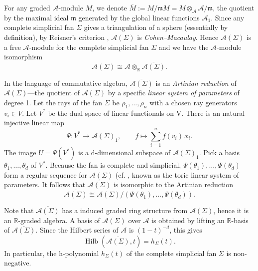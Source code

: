 \documentclass{amsart}
\theoremstyle{definition}
\theoremstyle{remark}
\numberwithin{equation}{section}
\begin{document}
For any graded $\mathcal{A}$-module $M$, we denote $\overline{M}:=M / \mathfrak{m} M=M \otimes_\mathcal{A} \mathcal{A} / \mathfrak{m}$, the quotient by the maximal ideal $\mathfrak{m}$ generated by the global linear functions $\mathcal{A}_1$. Since any complete simplicial fan $\Sigma$ gives a triangulation of a sphere (essentially by definition), by Reisner's criterion \cite[Theorem 5.53]{miller2005combinatorial}, $\mathcal{A}(\Sigma)$ is \emph{Cohen--Macaulay}. Hence $\mathcal{A}(\Sigma)$ is a free $\mathcal{A}$-module for the complete simplicial fan $\Sigma$ \cite[Theorem 13.37]{miller2005combinatorial} and we have the $\mathcal{A}$-module isomorphism 
\begin{equation} \label{eq-free}
  \mathcal{A}(\Sigma)\cong \mathcal{A}\otimes_{\mathbb{R}}\overline{\mathcal{A}(\Sigma)}.  
\end{equation}

In the language of commutative algebra, $\overline{\mathcal{A}(\Sigma)}$ is an \emph{Artinian reduction} of $\mathcal{A}(\Sigma)$---the quotient of $\mathcal{A}(\Sigma)$ by a specific \emph{linear system of parameters} of degree 1. Let the rays of the fan $\Sigma$ be $\rho_1,\dots,\rho_n$ with a chosen ray generators $v_i \in V$. Let $V^*$ be the dual space of linear functionals on V. There is an natural injective linear map
\begin{equation}\label{eq-injective}
    \Psi: V^* \longrightarrow \mathcal{A}(\Sigma)_1, \qquad f \longmapsto \sum_{i=1}^n f(v_i)\,x_i .
\end{equation}
The image $U = \Psi(V^*)$ is a d-dimensional subspace of $\mathcal{A}(\Sigma)_1$. Pick a basis $\theta_1,\dots,\theta_d$ of $V^*$. Because the fan is complete and simplicial, $\Psi(\theta_1), \dots,\Psi(\theta_d)$ form a regular sequence for $\mathcal{A}(\Sigma)$ (cf. \cite[eq. (1.2), p.250]{stembridge1994some}, known as the toric linear system of parameters. It follows that 
$\overline{\mathcal{A}(\Sigma)}$ is isomorphic to the Artinian reduction \begin{equation} \label{eq-toric}
    \overline{\mathcal{A}(\Sigma)}\cong\mathcal{A}(\Sigma)/\left(\Psi(\theta_1), \dots,\Psi(\theta_d)\right).
\end{equation}

Note that $\overline{\mathcal{A}(\Sigma)}$ has a induced graded ring structure from $\mathcal{A}(\Sigma)$, hence it is an $\mathbb{R}$-graded algebra.
A basis of $\mathcal{A}(\Sigma)$ over $\mathcal{A}$ is obtained by lifting an $\mathbb{R}$-basis of $\overline{\mathcal{A}(\Sigma)}$. 
 Since the Hilbert series of $\mathcal{A}$ is $(1-t)^{-d}$, this gives
$$
\operatorname{Hilb}(\overline{\mathcal{A}(\Sigma)}, t)=h_\Sigma( t).
$$ In particular, the h-polynomial $h_\Sigma( t)$ of the complete simplicial fan $\Sigma$ is non-negative. 
\end{document}
